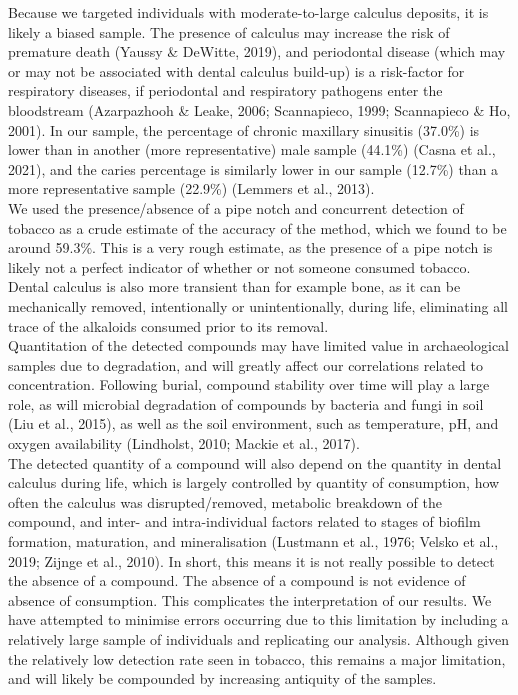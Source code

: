 \documentclass[
  letterpaper,
]{book}
\begin{document}
Because we targeted individuals with moderate-to-large calculus
deposits, it is likely a biased sample. The presence of calculus may
increase the risk of premature death (Yaussy \& DeWitte, 2019), and
periodontal disease (which may or may not be associated with dental
calculus build-up) is a risk-factor for respiratory diseases, if
periodontal and respiratory pathogens enter the bloodstream (Azarpazhooh
\& Leake, 2006; Scannapieco, 1999; Scannapieco \& Ho, 2001). In our
sample, the percentage of chronic maxillary sinusitis (37.0\%) is lower
than in another (more representative) male sample (44.1\%) (Casna et
al., 2021), and the caries percentage is similarly lower in our sample
(12.7\%) than a more representative sample (22.9\%) (Lemmers et al.,
2013).\\
We used the presence/absence of a pipe notch and concurrent detection of
tobacco as a crude estimate of the accuracy of the method, which we
found to be around 59.3\%. This is a very rough estimate, as the
presence of a pipe notch is likely not a perfect indicator of whether or
not someone consumed tobacco. Dental calculus is also more transient
than for example bone, as it can be mechanically removed, intentionally
or unintentionally, during life, eliminating all trace of the alkaloids
consumed prior to its removal.\\
Quantitation of the detected compounds may have limited value in
archaeological samples due to degradation, and will greatly affect our
correlations related to concentration. Following burial, compound
stability over time will play a large role, as will microbial
degradation of compounds by bacteria and fungi in soil (Liu et al.,
2015), as well as the soil environment, such as temperature, pH, and
oxygen availability (Lindholst, 2010; Mackie et al., 2017).\\
The detected quantity of a compound will also depend on the quantity in
dental calculus during life, which is largely controlled by quantity of
consumption, how often the calculus was disrupted/removed, metabolic
breakdown of the compound, and inter- and intra-individual factors
related to stages of biofilm formation, maturation, and mineralisation
(Lustmann et al., 1976; Velsko et al., 2019; Zijnge et al., 2010). In
short, this means it is not really possible to detect the absence of a
compound. The absence of a compound is not evidence of absence of
consumption. This complicates the interpretation of our results. We have
attempted to minimise errors occurring due to this limitation by
including a relatively large sample of individuals and replicating our
analysis. Although given the relatively low detection rate seen in
tobacco, this remains a major limitation, and will likely be compounded
by increasing antiquity of the samples.
\end{document}

